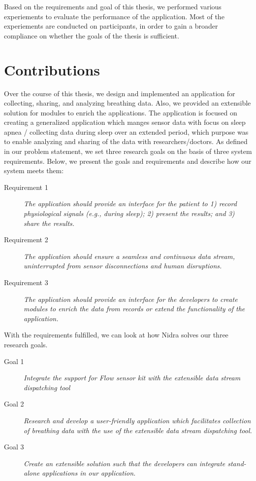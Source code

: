 Based on the requirements and goal of this thesis, we performed various experiements to evaluate the performance of the application. Most of the experiements are conducted on participants, in order to gain a broader compliance on whether the goals of the thesis is sufficient.

\section{Contributions}
Over the course of this thesis, we design and implemented an application for collecting, sharing, and analyzing breathing data. Also, we provided an extensible solution for modules to enrich the applications. The application is focused on creating a generalized application which manges sensor data with focus on sleep apnea / collecting data during sleep over an extended period, which purpose was to enable analyzing and sharing of the data with researchers/doctors. As defined in our problem statement, we set three research goals on the basis of three system requirements. Below, we present the goals and requirements and describe how our system meets them:

\begin{description}
    \item[Requirement 1] \textit{The application should provide an interface for the patient to 1) record physiological signals (e.g., during sleep); 2) present the results; and 3) share the results.}
    \item[Requirement 2] \textit{The application should ensure a seamless and continuous data stream, uninterrupted from sensor disconnections and human disruptions.}
    \item[Requirement 3] \textit{The application should provide an interface for the developers to create modules to enrich the data from records or extend the functionality of the application.}
\end{description}

With the requirements fulfilled, we can look at how Nidra solves our three research goals.

\begin{description}
    \item[Goal 1] \textit{Integrate the support for Flow sensor kit with the extensible data stream dispatching tool}
    \item[Goal 2] \textit{Research and develop a user-friendly application which facilitates collection of breathing data with the use of the extensible data stream dispatching tool.}
    \item[Goal 3] \textit{Create an extensible solution such that the developers can integrate stand-alone applications in our application.}
\end{description}



